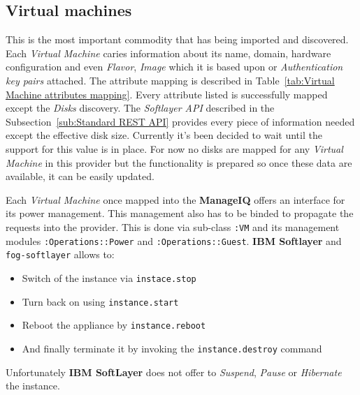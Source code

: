 \subsection{Virtual machines}
\label{sub:Virtual machines}

This is the most important commodity that has being imported and discovered. Each \emph{Virtual Machine} caries information about its name, domain, hardware configuration and even \emph{Flavor}, \emph{Image} which it is based upon or \emph{Authentication key pairs} attached. The attribute mapping is described in Table~\ref{tab:Virtual Machine attributes mapping}. Every attribute listed is successfully mapped except the \emph{Disks} discovery. The \emph{Softlayer API} described in the Subsection~\ref{sub:Standard REST API} provides every piece of information needed except the effective disk size. Currently it's been decided to wait until the support for this value is in place. For now no disks are mapped for any \emph{Virtual Machine} in this provider but the functionality is prepared so once these data are available, it can be easily updated.

Each \emph{Virtual Machine} once mapped into the \textbf{ManageIQ} offers an interface for its power management. This management also has to be binded to propagate the requests into the provider. This is done via sub-class \texttt{:VM} and its management modules \texttt{:Operations::Power} and \texttt{:Operations::Guest}. \textbf{IBM Softlayer} and \texttt{fog-softlayer} allows to:

\begin{itemize}
	\item Switch of the instance via \texttt{instace.stop}
	\item Turn back on using \texttt{instance.start}
	\item Reboot the appliance by \texttt{instance.reboot}
	\item And finally terminate it by invoking the \texttt{instance.destroy} command
\end{itemize}

Unfortunately \textbf{IBM SoftLayer} does not offer to \emph{Suspend}, \emph{Pause} or \emph{Hibernate} the instance.

